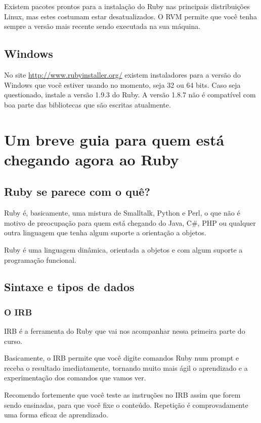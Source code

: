 \documentclass[12pt]{book} %
\begin{document}
Existem pacotes prontos para a instalação do Ruby nas principais distribuições Linux, mas estes costumam estar desatualizados. O RVM permite que você tenha sempre a versão mais recente sendo executada na sua máquina.

\subsection{Windows}
No site \url{http://www.rubyinstaller.org/} existem instaladores para a versão do Windows que você estiver usando no momento, seja 32 ou 64 bits. Caso seja questionado, instale a versão 1.9.3 do Ruby. A versão 1.8.7 não é compatível com boa parte das bibliotecas que são escritas atualmente.

\section{Um breve guia para quem está chegando agora ao Ruby}

\subsection{Ruby se parece com o quê?}

Ruby é, basicamente, uma mistura de Smalltalk, Python e Perl, o que não é motivo de preocupação para quem está chegando do Java, C\#, PHP ou qualquer outra linguagem que tenha algum suporte a orientação a objetos.

Ruby é uma linguagem dinâmica, orientada a objetos e com algum suporte a programação funcional.

\subsection{Sintaxe e tipos de dados}
\subsubsection{O IRB}
IRB é a ferramenta do Ruby que vai nos acompanhar nessa primeira parte do curso.

Basicamente, o IRB permite que você digite comandos Ruby num prompt e receba o resultado imediatamente, tornando muito mais ágil o aprendizado e a experimentação dos comandos que vamos ver.

Recomendo fortemente que você teste as instruções no IRB assim que forem sendo ensinadas, para que você fixe o conteúdo. Repetição é comprovadamente uma forma eficaz de aprendizado.
\end{document}
